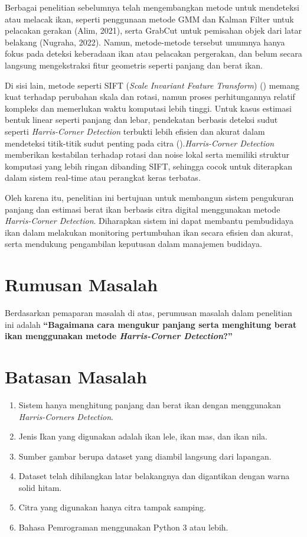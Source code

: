 Berbagai penelitian sebelumnya telah mengembangkan metode untuk mendeteksi atau melacak ikan, seperti penggunaan metode GMM dan Kalman Filter untuk pelacakan gerakan (Alim, 2021), serta GrabCut untuk pemisahan objek dari latar belakang (Nugraha, 2022). Namun, metode-metode tersebut umumnya hanya fokus pada deteksi keberadaan ikan atau pelacakan pergerakan, dan belum secara langsung mengekstraksi fitur geometris seperti panjang dan berat ikan.

Di sisi lain, metode seperti SIFT (\emph{Scale Invariant Feature Transform}) (\cite{Lowe2004}) memang kuat terhadap perubahan skala dan rotasi, namun proses perhitungannya relatif kompleks dan memerlukan waktu komputasi lebih tinggi. Untuk kasus estimasi bentuk linear seperti panjang dan lebar, pendekatan berbasis deteksi sudut seperti \emph{Harris-Corner Detection} terbukti lebih efisien dan akurat dalam mendeteksi titik-titik sudut penting pada citra (\cite{Harris2013}).\emph{Harris-Corner Detection} memberikan kestabilan terhadap rotasi dan noise lokal serta memiliki struktur komputasi yang lebih ringan dibanding SIFT, sehingga cocok untuk diterapkan dalam sistem real-time atau perangkat keras terbatas.

Oleh karena itu, penelitian ini bertujuan untuk membangun sistem pengukuran panjang dan estimasi berat ikan berbasis citra digital menggunakan metode \emph{Harris-Corner Detection}. Diharapkan sistem ini dapat membantu pembudidaya ikan dalam melakukan monitoring pertumbuhan ikan secara efisien dan akurat, serta mendukung pengambilan keputusan dalam manajemen budidaya.

\section{Rumusan Masalah}
Berdasarkan pemaparan masalah di atas, perumusan masalah dalam penelitian ini adalah \textbf{“Bagaimana cara mengukur panjang serta menghitung berat ikan menggunakan metode \emph{Harris-Corner Detection}?”}

\section{Batasan Masalah}
\begin{enumerate}
	\item Sistem hanya menghitung panjang dan berat ikan dengan menggunakan \emph{Harris-Corners Detection}. 
	\item Jenis Ikan yang digunakan adalah ikan lele, ikan mas, dan ikan nila.
	\item Sumber gambar berupa dataset yang diambil langsung dari lapangan.
	\item Dataset telah dihilangkan latar belakangnya dan digantikan dengan warna solid hitam.
	\item Citra yang digunakan hanya citra tampak samping. 
	\item Bahasa Pemrograman menggunakan Python 3 atau lebih. 
\end{enumerate}
	
